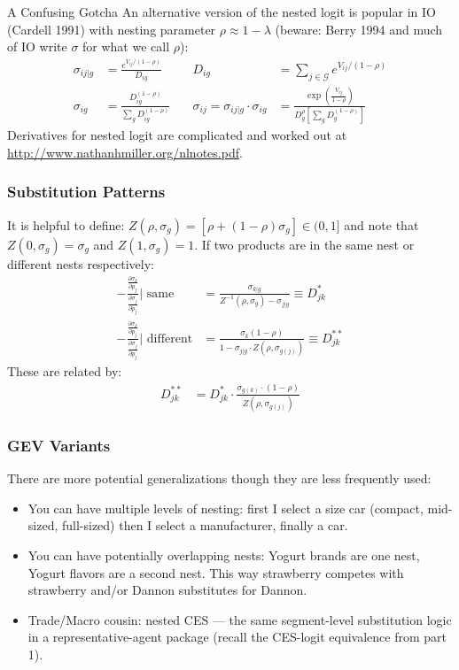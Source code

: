 \documentclass[aspectratio=169,11pt]{beamer}
\begin{document}
\begin{frame}{A Confusing Gotcha}
An alternative version of the nested logit is popular in IO (Cardell 1991) with nesting parameter $\rho \approx 1-\lambda$ (beware: Berry 1994 and much of IO write $\sigma$ for what we call $\rho$):
\begin{align*}
\sigma_{ij|g}&=\frac{e^{V_{ij}/(1-\rho)}}{D_{ig}}  \quad &
D_{ig}&= \sum_{j \in \mathcal{G}} e^{V_{ij}/(1-\rho)}   \\
\sigma_{ig}&=\frac{D_{ig}^{(1-\rho)}}{\sum_{g} D_{ig}^{(1-\rho)}} \quad &
\sigma_{ij}=  \sigma_{ij|g}\cdot \sigma_{ig} &=\frac{\exp \left(\frac{V_{ij}}{1-\rho}\right)}{D_{g}^{\rho}\left[\sum_{g} D_{g}^{(1-\rho)}\right]}
\end{align*}
Derivatives for nested logit are complicated and worked out at \url{http://www.nathanhmiller.org/nlnotes.pdf}.
\end{frame}

\begin{frame}
\frametitle{Substitution Patterns}
It is helpful to define: $Z(\rho,\sigma_g)=[\rho + (1-\rho) \sigma_g ] \in (0,1]$ and note that $Z(0,\sigma_g)=\sigma_g$ and $Z(1,\sigma_g)=1$. If two products are in the same nest or different nests respectively:
\begin{align*}
 -\frac{\frac{\partial \sigma_{k}}{\partial p_j}}{\frac{\partial \sigma_{j}}{\partial p_j} } \text{| same}
&=\frac{ \sigma_{k|g} }{ Z^{-1}(\rho,\sigma_g) - \sigma_{j|g}}  \equiv D_{jk}^{*}\\
 -\frac{\frac{\partial \sigma_{k}}{\partial p_j}}{\frac{\partial \sigma_{j}}{\partial p_j} } \text{| different}
&= \frac{ \sigma_{k}  (1-\rho) }{ 1 - \sigma_{j|g} \cdot Z(\rho,\sigma_{g(j)}) } \equiv D_{jk}^{**}
\end{align*}
These are related by:
\begin{align*}
D_{jk}^{**}&=  D_{jk}^{*} \cdot \frac{\sigma_{g(k)} \cdot (1-\rho)}{Z(\rho,\sigma_{g(j)})}
\end{align*}
\end{frame}


\begin{frame}
\frametitle{GEV Variants}
There are more potential generalizations though they are less frequently used:
 \begin{itemize}
\item You can have multiple levels of nesting: first I select a size car (compact, mid-sized, full-sized) then I select a manufacturer, finally a car.
\item You can have potentially overlapping nests: Yogurt brands are one nest, Yogurt flavors are a second nest. This way strawberry competes with strawberry and/or Dannon substitutes for Dannon.
\item Trade/Macro cousin: \alert{nested CES} --- the same segment-level substitution logic in a representative-agent package (recall the CES-logit equivalence from part 1).
 \end{itemize}
\end{frame}
\end{document}
